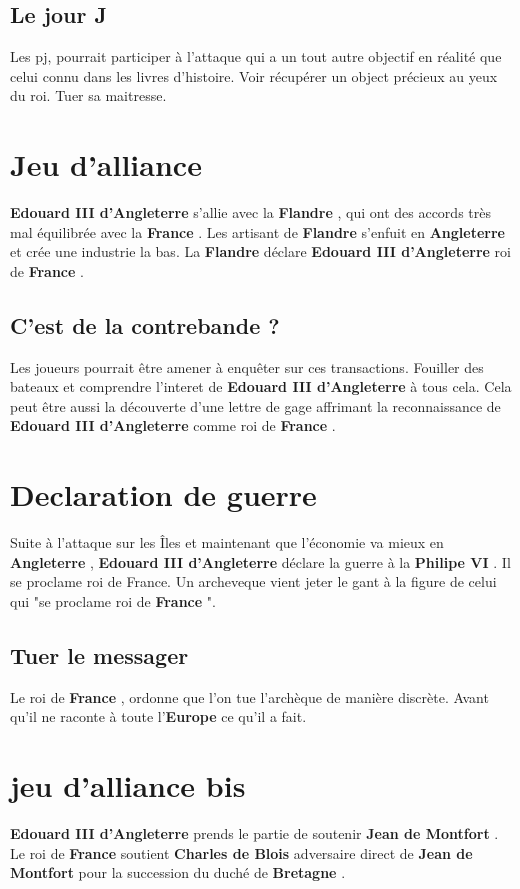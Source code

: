 \documentclass[oneside,12pt]{book}
\newcommand{\France}{\textbf{France} }
\newcommand{\Europe}{\textbf{Europe} }
\newcommand{\Angleterre}{\textbf{Angleterre} }
\newcommand{\Bretagne}{\textbf{Bretagne} }
\newcommand{\Flandre}{\textbf{Flandre} }
\newcommand{\PhilipeVI}{\textbf{Philipe VI} }%
\newcommand{\JeanDeMonfort}{\textbf{Jean de Montfort} }%
\newcommand{\CharlesDeBlois}{\textbf{Charles de Blois} }
\newcommand{\EdouardIII}{\textbf{Edouard III d'Angleterre} }%
\begin{document}
\begin{flushleft}
 \subsection{Le jour J}
     Les pj, pourrait participer à l'attaque qui a un tout autre objectif en réalité que celui connu dans les livres d'histoire. 
     Voir récupérer un object précieux au yeux du roi. Tuer sa maitresse. 
      

\section{Jeu d'alliance}
    \EdouardIII s'allie avec la \Flandre, qui ont des accords très mal équilibrée avec la \France. 
Les artisant de \Flandre s'enfuit en \Angleterre et crée une industrie la bas.
 La \Flandre déclare \EdouardIII roi de \France.  


    \subsection{C'est de la contrebande ?}
    Les joueurs pourrait être amener à enquêter sur ces transactions. 
Fouiller des bateaux et comprendre l'interet de \EdouardIII à tous cela. 
Cela peut être aussi la découverte d'une lettre de gage affrimant la reconnaissance de \EdouardIII comme roi de \France. 
    
\section{Declaration de guerre}
 Suite à l'attaque sur les Îles et maintenant que l'économie va mieux en \Angleterre,
 \EdouardIII déclare la guerre à la \PhilipeVI. Il se proclame roi de France.
Un archeveque vient jeter le gant à la figure de celui qui "se proclame roi de \France". 

\subsection{Tuer le messager}
Le roi de \France, ordonne que l'on tue l'archèque de manière discrète. Avant qu'il ne raconte à toute l'\Europe ce qu'il a fait. 

\section{jeu d'alliance bis}
\EdouardIII prends le partie de soutenir \JeanDeMonfort . Le roi de \France soutient \CharlesDeBlois adversaire direct de 
\JeanDeMonfort pour la succession du duché de \Bretagne.


\end{flushleft}
\end{document}
